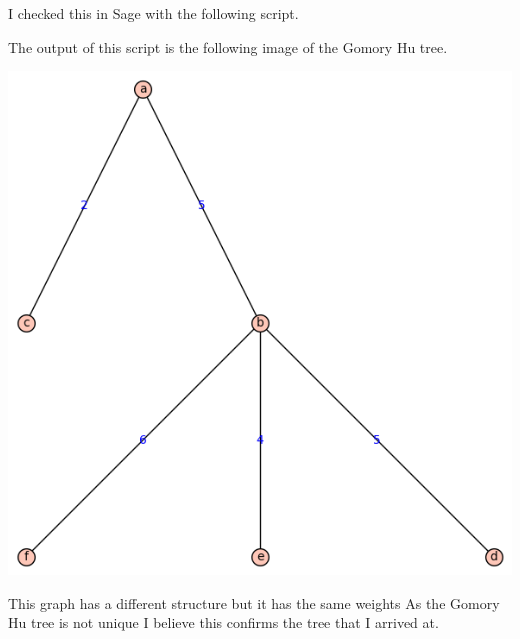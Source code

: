 \documentclass[11pt, oneside]{article}
\begin{document}
\begin{enumerate}
    I checked this in Sage with the following script.
    
    The output of this script is the following image of the Gomory Hu tree.
    \begin{center}
      \includegraphics[scale=.8]{Figures/07_1.png}
    \end{center}
    This graph has a different structure but it has the same weights
    As the Gomory Hu tree is not unique I believe this confirms the
    tree that I arrived at.

\end{enumerate}
\end{document}

